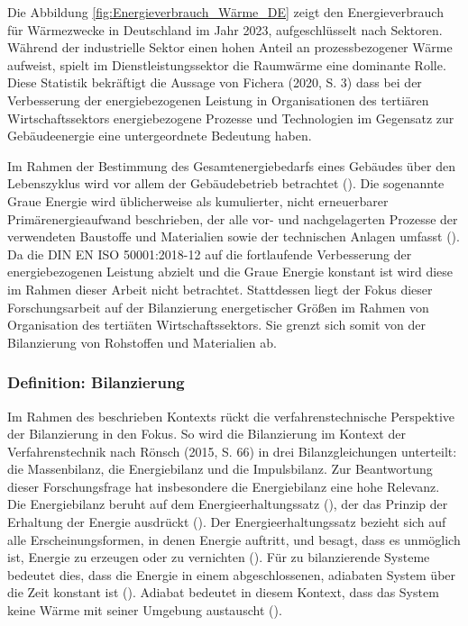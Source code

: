Die Abbildung \ref{fig:Energieverbrauch_Wärme_DE} zeigt den Energieverbrauch für Wärmezwecke in Deutschland im Jahr 2023, aufgeschlüsselt nach Sektoren. 
Während der industrielle Sektor einen hohen Anteil an prozessbezogener Wärme aufweist, spielt im Dienstleistungssektor die Raumwärme 
eine dominante Rolle.
Diese Statistik bekräftigt die Aussage von Fichera (2020, S. 3) dass bei der Verbesserung der energiebezogenen Leistung in Organisationen des tertiären 
Wirtschaftssektors energiebezogene Prozesse und Technologien im Gegensatz zur Gebäudeenergie eine untergeordnete Bedeutung haben. 

Im Rahmen der Bestimmung des Gesamtenergiebedarfs eines Gebäudes über den Lebenszyklus wird vor allem der Gebäudebetrieb betrachtet (\cite[S. 133]{Musall.2015}).
Die sogenannte Graue Energie wird üblicherweise als kumulierter, nicht erneuerbarer Primärenergieaufwand beschrieben, der alle vor- und nachgelagerten 
Prozesse der verwendeten Baustoffe und Materialien sowie der technischen Anlagen umfasst (\cite[S. 133]{Musall.2015}). Da die DIN EN ISO 50001:2018-12 
auf die fortlaufende Verbesserung der energiebezogenen Leistung abzielt und die Graue Energie konstant ist wird diese im Rahmen dieser Arbeit nicht 
betrachtet. 
Stattdessen liegt der Fokus dieser Forschungsarbeit auf der Bilanzierung energetischer Größen im Rahmen von Organisation des tertiäten Wirtschaftssektors. 
Sie grenzt sich somit von der Bilanzierung von Rohstoffen und Materialien ab.


\subsubsection{Definition: Bilanzierung}
Im Rahmen des beschrieben Kontexts rückt die verfahrenstechnische Perspektive der Bilanzierung in den Fokus. 
So wird die Bilanzierung im Kontext der Verfahrenstechnik nach Rönsch (2015, S. 66) in drei Bilanzgleichungen unterteilt: 
die Massenbilanz, die Energiebilanz und die Impulsbilanz. 
Zur Beantwortung dieser Forschungsfrage hat insbesondere die Energiebilanz eine hohe Relevanz.
Die Energiebilanz beruht auf dem Energieerhaltungssatz (\cite[S. 66]{Rönsch.2015}), der das Prinzip der Erhaltung 
der Energie ausdrückt (\cite[S. 57]{Baehr.1966}). Der Energieerhaltungssatz bezieht sich auf alle Erscheinungsformen, in denen Energie auftritt, 
und besagt, dass es unmöglich ist, Energie zu erzeugen oder zu vernichten (\cite[S. 57]{Baehr.1966}). 
Für zu bilanzierende Systeme bedeutet dies, dass die Energie in einem abgeschlossenen, adiabaten System über die Zeit 
konstant ist (\cite[S. 66]{Rönsch.2015}). 
Adiabat bedeutet in diesem Kontext, dass das System keine Wärme mit seiner Umgebung austauscht (\cite[S. 66]{Rönsch.2015}). 

